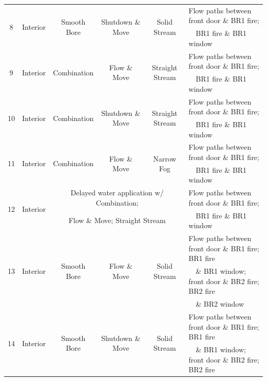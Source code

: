 \documentclass[12pt,oneside]{book}
\begin{document}
\begin{table}[!ht]
{\begin{tabular}{|c|c|c|c|c|l|}
\hline
\multirow{2}{*}{8}	& \multirow{2}{*}{Interior} & \multirow{2}{*}{Smooth Bore} 	& \multirow{2}{*}{Shutdown \& Move}	& \multirow{2}{*}{Solid Stream} 	& Flow paths between front door \& BR1 fire; 	\\
 					& 							& 								& 									& 									& ~~BR1 fire \& BR1 window 	\\
\hline
\multirow{2}{*}{9}	& \multirow{2}{*}{Interior} & \multirow{2}{*}{Combination} 	& \multirow{2}{*}{Flow \& Move}		& \multirow{2}{*}{Straight Stream} 	& Flow paths between front door \& BR1 fire; \\
					& 							& 								& 									& 									& ~~BR1 fire \& BR1 window 	\\
\hline
\multirow{2}{*}{10}	& \multirow{2}{*}{Interior} & \multirow{2}{*}{Combination} 	& \multirow{2}{*}{Shutdown \& Move}	& \multirow{2}{*}{Straight Stream} 	& Flow paths between front door \& BR1 fire; 	\\
 					& 							& 								& 									& 									& ~~BR1 fire \& BR1 window 	\\
\hline
\multirow{2}{*}{11}	& \multirow{2}{*}{Interior} & \multirow{2}{*}{Combination} 	& \multirow{2}{*}{Flow \& Move} 	&  \multirow{2}{*}{Narrow Fog} 		& Flow paths between front door \& BR1 fire; 	\\
 					& 							& 								& 									&  									& ~~BR1 fire \& BR1 window 	\\
\hline
\multirow{2}{*}{12}	& \multirow{2}{*}{Interior} & \multicolumn{3}{c|}{Delayed water application w/ Combination;} 										& Flow paths between front door \& BR1 fire; 	\\
					& 							& \multicolumn{3}{c|}{Flow \& Move; Straight Stream} 													& ~~BR1 fire \& BR1 window 	\\
\hline \hline
\multirow{3}{*}{13}	& \multirow{3}{*}{Interior} & \multirow{3}{*}{Smooth Bore} 	& \multirow{3}{*}{Flow \& Move}		& \multirow{3}{*}{Solid Stream} 	& Flow paths between front door \& BR1 fire; BR1 fire \\
					& 							& 								& 									& 									& ~~\& BR1 window; front door \& BR2 fire; BR2 fire	\\
					& 							& 								& 									& 									& ~~\& BR2 window \\
\hline
\multirow{3}{*}{14}	& \multirow{3}{*}{Interior} & \multirow{3}{*}{Smooth Bore} 	& \multirow{3}{*}{Shutdown \& Move}	& \multirow{3}{*}{Solid Stream} 	& Flow paths between front door \& BR1 fire; BR1 fire \\
					& 							& 								& 									& 									& ~~\& BR1 window; front door \& BR2 fire; BR2 fire	\\

\end{tabular}}
\end{table}
\end{document}
